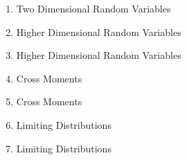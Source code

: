 \documentclass[12pt, oneside]{article}
\begin{document}
\begin{enumerate}
\item Two Dimensional Random Variables

\item Higher Dimensional Random Variables

\item Higher Dimensional Random Variables

\item Cross Moments

\item Cross Moments

\item Limiting Distributions

\item Limiting Distributions



\end{enumerate}
\end{document}

